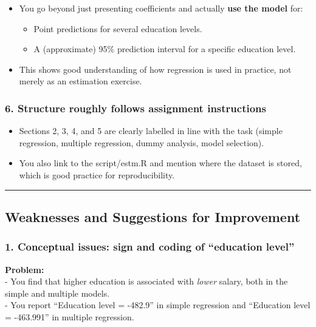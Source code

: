 \documentclass[
  letterpaper,
  DIV=11,
  numbers=noendperiod]{scrartcl}
\providecommand{\tightlist}{%
  \setlength{\itemsep}{0pt}\setlength{\parskip}{0pt}}
\begin{document}
\begin{itemize}
\tightlist
\item
  You go beyond just presenting coefficients and actually \textbf{use
  the model} for:

  \begin{itemize}
  \tightlist
  \item
    Point predictions for several education levels.
  \item
    A (approximate) 95\% prediction interval for a specific education
    level.
  \end{itemize}
\item
  This shows good understanding of how regression is used in practice,
  not merely as an estimation exercise.
\end{itemize}

\subsubsection{6. Structure roughly follows assignment
instructions}\label{structure-roughly-follows-assignment-instructions}

\begin{itemize}
\tightlist
\item
  Sections 2, 3, 4, and 5 are clearly labelled in line with the task
  (simple regression, multiple regression, dummy analysis, model
  selection).
\item
  You also link to the script/estm.R and mention where the dataset is
  stored, which is good practice for reproducibility.
\end{itemize}

\begin{center}\rule{0.5\linewidth}{0.5pt}\end{center}

\subsection{Weaknesses and Suggestions for
Improvement}\label{weaknesses-and-suggestions-for-improvement}

\subsubsection{1. Conceptual issues: sign and coding of ``education
level''}\label{conceptual-issues-sign-and-coding-of-education-level}

\textbf{Problem:}\\
- You find that higher education is associated with \emph{lower} salary,
both in the simple and multiple models.\\
- You report ``Education level = -482.9'' in simple regression and
``Education level = -463.991'' in multiple regression.
\end{document}

